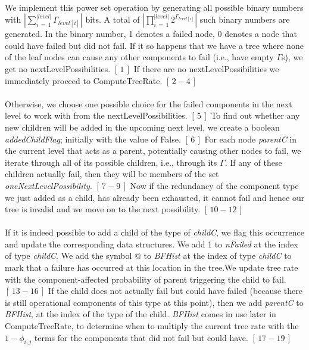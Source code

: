 \documentclass[12pt]{article}
\newcommand{\citeLine}[1]{$[\,#1\,]$}
\newcommand{\citeBlock}[2]{$[\,#1 - #2\,]$}
\begin{document}
\paragraph{} We implement this power set operation by generating all possible binary numbers with $|\sum\limits_{i\,=\,1}^{|level|}\Gamma_{level[i]}|$ bits. A total of $|\prod\limits_{i\,=\,1}^{|level|}2^{\Gamma_{level[i]}}|$ such binary numbers are generated. In the binary number, 1 denotes a failed node, 0 denotes a node that could have failed but did not fail. If it so happens that we have a tree where none of the leaf nodes can cause any other components to fail (i.e., have empty $\Gamma$s), we get no nextLevelPossibilities. \citeLine{1} If there are no nextLevelPossibilities we immediately proceed to ComputeTreeRate. \citeBlock{2}{4}

\paragraph{} Otherwise, we choose one possible choice for the failed components in the next level to work with from the nextLevelPossibilities. \citeLine{5} To find out whether any new children will be added in the upcoming next level, we create a boolean \textit{addedChildFlag}; initially with the value of False. \citeLine{6} For each node \textit{parentC} in the current level that acts as a parent, potentially causing other nodes to fail, we iterate through all of its possible children, i.e., through its $\Gamma$. If any of these children actually fail, then they will be members of the set \textit{oneNextLevelPossibility}. \citeBlock{7}{9} Now if the redundancy of the component type we just added as a child, has already been exhausted, it cannot fail and hence our tree is invalid and we move on to the next possibility. \citeBlock{10}{12}

\paragraph{} If it is indeed possible to add a child of the type of \textit{childC}, we flag this occurrence and update the corresponding data structures. We add 1 to \textit{nFailed} at the index of type \textit{childC}. We add the symbol @ to \textit{BFHist} at the index of type \textit{childC} to mark that a failure has occurred at this location in the tree.We update tree rate with the component-affected probability of parent triggering the child to fail. \citeBlock{13}{16} If the child does not actually fail but could have failed (because there is still operational components of this type at this point), then we add \textit{parentC} to \textit{BFHist}, at the index of the type of the child. \textit{BFHist} comes in use later in ComputeTreeRate, to determine when to multiply the current tree rate with the $1-\phi_{i,j}$ terms for the components that did not fail but could have. \citeBlock{17}{19}
\end{document}
